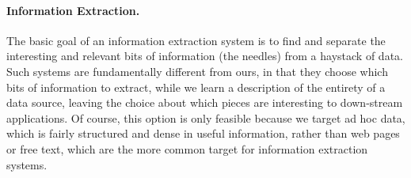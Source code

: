 

\paragraph*{Information Extraction.}

The basic goal of an information extraction system is to find and
separate the interesting and relevant bits of information (the
needles) from a haystack of data.  Such systems are fundamentally
different from ours, in that they choose which bits of information to
extract, while we learn a description of the entirety of a data
source, leaving the choice about which pieces are interesting to
down-stream applications.  Of course, this option is only feasible
because we target ad hoc data, which is fairly structured and dense in
useful information, rather than web pages or free text, which are the
more common target for information extraction systems. 

